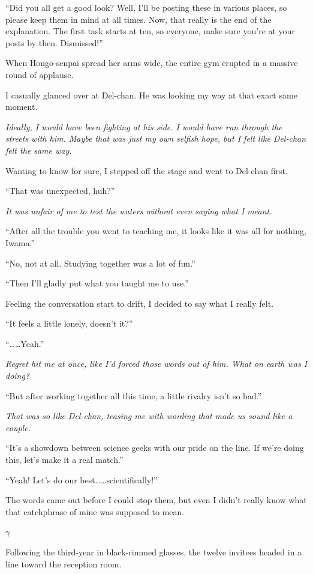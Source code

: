 \documentclass[
    a4paper,
    12pt,
    twoside,
    openany,
    UTF8,
    fontset=windows
]{ctexbook}
\begin{document}
``Did you all get a good look? Well, I'll be posting these in various places, so please keep them in mind at all times. Now, that really is the end of the explanation. The first task starts at ten, so everyone, make sure you're at your posts by then. Dismissed!''

When Hongo-senpai spread her arms wide, the entire gym erupted in a massive round of applause.

I casually glanced over at Del-chan. He was looking my way at that exact same moment.

\textit{Ideally, I would have been fighting at his side. I would have run through the streets with him. Maybe that was just my own selfish hope, but I felt like Del-chan felt the same way.}

Wanting to know for sure, I stepped off the stage and went to Del-chan first.

``That was unexpected, huh?''

\textit{It was unfair of me to test the waters without even saying what I meant.}

``After all the trouble you went to teaching me, it looks like it was all for nothing, Iwama.''

``No, not at all. Studying together was a lot of fun.''

``Then I'll gladly put what you taught me to use.''

Feeling the conversation start to drift, I decided to say what I really felt.

``It feels a little lonely, doesn't it?''

``\dots\dots Yeah.''

\textit{Regret hit me at once, like I'd forced those words out of him. What on earth was I doing?}

``But after working together all this time, a little rivalry isn't so bad.''

\textit{That was so like Del-chan, teasing me with wording that made us sound like a couple.}

``It's a showdown between science geeks with our pride on the line. If we're doing this, let's make it a real match.''

``Yeah! Let's do our best\dots\dots scientifically!''

The words came out before I could stop them, but even I didn't really know what that catchphrase of mine was supposed to mean.

$\gamma$

Following the third-year in black-rimmed glasses, the twelve invitees headed in a line toward the reception room.
\end{document}
